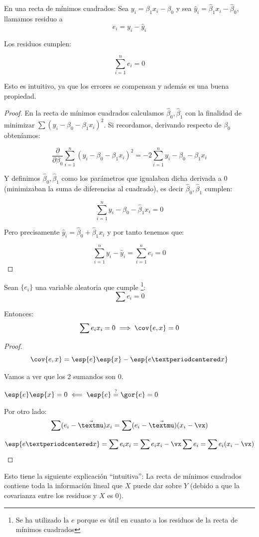 \begin{itemize}
\begin{prop}
\begin{enumerate}
		\end{enumerate}

	\end{prop}


\begin{defn}[Residuo]
En una recta de mínimos cuadrados: Sea $y_i = β_1x_i - β_0$ y sea $\hat{y}_i = \hat{β}_1x_i - \hat{β}_0$, llamamos residuo a $$e_i = y_i - \hat{y}_i$$

Los residuos cumplen:

\[
\sum_{i=1}^n e_i = 0
\]

Esto es intuitivo, ya que los errores se compensan y además es una buena propiedad.
\end{defn}
\begin{proof}
	En la recta de mínimos cuadrados calculamos $\hat{β}_0,\hat{β}_1$ con la finalidad de minimizar $\sum (y_i - β_0 - β_1x_i)^2$. Si recordamos, derivando respecto de $β_0$ obteníamos:

	\[\frac{∂}{∂β_0}\sum_{i=1}^n (y_i -  β_0 - β_1x_i)^2 = -2 \sum_{i=1}^n y_i -  β_0 - β_1x_i\]

	Y definimos $\hat{β}_0,\hat{β}_1$ como los parámetros que igualaban dicha derivada a $0$ (minimizaban la suma de diferencias al cuadrado), es decir $\hat{β}_0,\hat{β}_1$ cumplen:

	\[\sum_{i=1}^n y_i -  \hat{β}_0 - \hat{β}_1x_i = 0\]

	Pero precisamente $\hat{y}_i=\hat{β}_0 + \hat{β}_1x_i$ y por tanto tenemos que:

	\[\sum_{i=1}^n y_i - \hat{y}_i = \sum_{i=1}^n e_i = 0\] 
\end{proof}



\begin{prop}
Sean $\{e_i\}$ una variable aleatoria que cumple \footnote{Se ha utilizado la $e$ porque es útil en cuanto a los residuos de la recta de mínimos cuadrados}:
\[\sum e_i = 0\]

Entonces:
\[\sum e_i x_i = 0 \implies \cov{e,x} = 0\]
\end{prop}

\begin{proof}
\[
\cov{e,x} = \esp{e}\esp{x} - \esp{e·x}
\]

Vamos a ver que los 2 sumandos son 0.

 $\esp{e}\esp{x} = 0 \impliedby \esp{e} \overset{?}{=} \gor{e} = 0$


Por otro lado:
\[ \sum (e_i - \vec{µ}) x_i = \sum (e_i - \vec{µ}) (x_i - \vx) \]


\[
\esp{e·x} = \sum e_ix_i = \sum e_ix_i - \vx \sum e_i = \sum e_i(x_i - \vx)
\]
\end{proof}


Esto tiene la siguiente explicación ``intuitiva'': La recta de mínimos cuadrados contiene toda la información lineal que $X$ puede dar sobre $Y$ (debido a que la covarianza entre los residuos y $X$ es 0).
\end{itemize}

